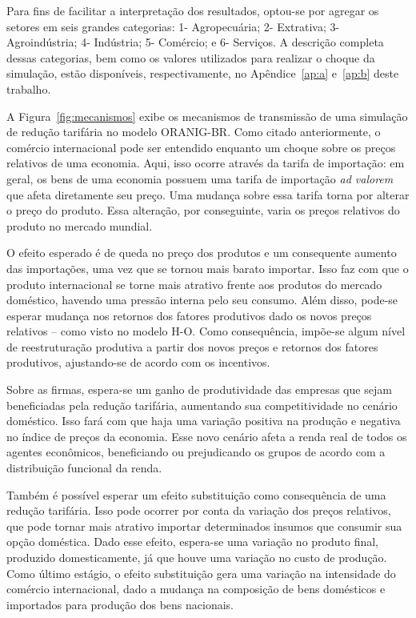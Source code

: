 Para fins de facilitar a interpretação dos resultados, optou-se por agregar os setores em seis grandes categorias: 1- Agropecuária; 2- Extrativa; 3- Agroindústria; 4- Indústria; 5- Comércio; e 6- Serviços. A descrição completa dessas categorias, bem como os valores utilizados para realizar o choque da simulação, estão disponíveis, respectivamente, no Apêndice~\ref{ap:a} e~\ref{ap:b} deste trabalho.

A Figura~\ref{fig:mecanismos} exibe os mecanismos de transmissão de uma simulação de redução tarifária no modelo ORANIG-BR. Como citado anteriormente, o comércio internacional pode ser entendido enquanto um choque sobre os preços relativos de uma economia. Aqui, isso ocorre através da tarifa de importação: em geral, os bens de uma economia possuem uma tarifa de importação \textit{ad valorem} que afeta diretamente seu preço. Uma mudança sobre essa tarifa torna por alterar o preço do produto. Essa alteração, por conseguinte, varia os preços relativos do produto no mercado mundial.

O efeito esperado é de queda no preço dos produtos e um consequente aumento das importações, uma vez que se tornou mais barato importar. Isso faz com que o produto internacional se torne mais atrativo frente aos produtos do mercado doméstico, havendo uma pressão interna pelo seu consumo. Além disso, pode-se esperar mudança nos retornos dos fatores produtivos dado os novos preços relativos -- como visto no modelo H-O. Como consequência, impõe-se algum nível de reestruturação produtiva a partir dos novos preços e retornos dos fatores produtivos, ajustando-se de acordo com os incentivos.

Sobre as firmas, espera-se um ganho de produtividade das empresas que sejam beneficiadas pela redução tarifária, aumentando sua competitividade no cenário doméstico. Isso fará com que haja uma variação positiva na produção e negativa no índice de preços da economia. Esse novo cenário afeta a renda real de todos os agentes econômicos, beneficiando ou prejudicando os grupos de acordo com a distribuição funcional da renda.

Também é possível esperar um efeito substituição como consequência de uma redução tarifária. Isso pode ocorrer por conta da variação dos preços relativos, que pode tornar mais atrativo importar determinados insumos que consumir sua opção doméstica. Dado esse efeito, espera-se uma variação no produto final, produzido domesticamente, já que houve uma variação no custo de produção. Como último estágio, o efeito substituição gera uma variação na intensidade do comércio internacional, dado a mudança na composição de bens domésticos e importados para produção dos bens nacionais.

